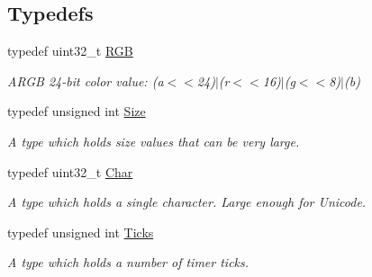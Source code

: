 \subsection*{Typedefs}
\begin{DoxyCompactItemize}
\item 
\hypertarget{namespaceGUI_aeafd135255365f3584da0e982fc79466}{typedef uint32\-\_\-t \hyperlink{namespaceGUI_aeafd135255365f3584da0e982fc79466}{R\-G\-B}}\label{namespaceGUI_aeafd135255365f3584da0e982fc79466}

\begin{DoxyCompactList}\small\item\em A\-R\-G\-B 24-\/bit color value\-: (a$<$$<$24)$|$(r$<$$<$16)$|$(g$<$$<$8)$|$(b) \end{DoxyCompactList}\item 
\hypertarget{namespaceGUI_a10b6232e08729baa0bd211a86a69ce36}{typedef unsigned int \hyperlink{namespaceGUI_a10b6232e08729baa0bd211a86a69ce36}{Size}}\label{namespaceGUI_a10b6232e08729baa0bd211a86a69ce36}

\begin{DoxyCompactList}\small\item\em A type which holds size values that can be very large. \end{DoxyCompactList}\item 
\hypertarget{namespaceGUI_af6b04b46d40197b4f00e553d7d1a3e4c}{typedef uint32\-\_\-t \hyperlink{namespaceGUI_af6b04b46d40197b4f00e553d7d1a3e4c}{Char}}\label{namespaceGUI_af6b04b46d40197b4f00e553d7d1a3e4c}

\begin{DoxyCompactList}\small\item\em A type which holds a single character. Large enough for Unicode. \end{DoxyCompactList}\item 
\hypertarget{namespaceGUI_af396fee5d5c26b98218f5803f85e3b65}{typedef unsigned int \hyperlink{namespaceGUI_af396fee5d5c26b98218f5803f85e3b65}{Ticks}}\label{namespaceGUI_af396fee5d5c26b98218f5803f85e3b65}

\begin{DoxyCompactList}\small\item\em A type which holds a number of timer ticks. \end{DoxyCompactList}\end{DoxyCompactItemize}
